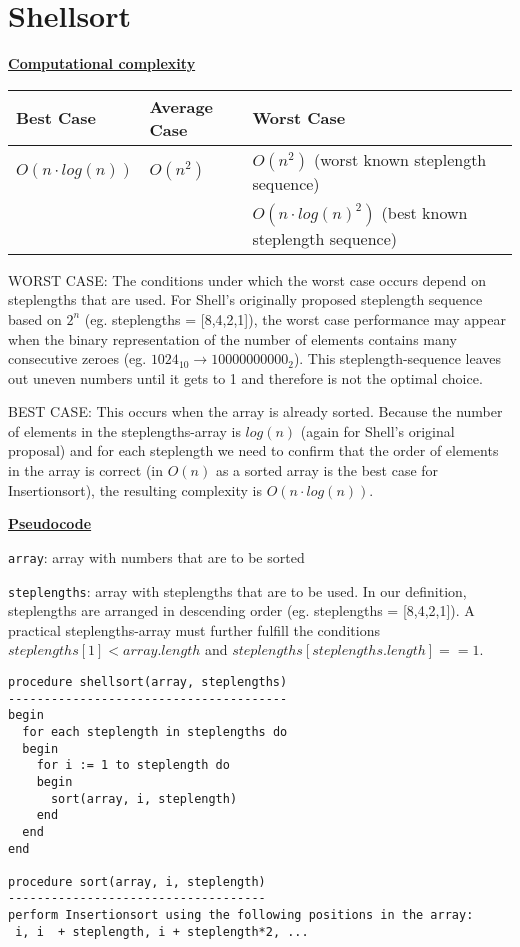 \documentclass[a4paper]{report}
\begin{document}
\chapter*{Shellsort}

\underline{\bf{Computational complexity}}

\begin{tabular}{|l|l| l |}
\hline
Best Case    & Average Case  &  Worst Case\\ \hline
$O(n\cdot log(n))$ & $O(n^2)$  &  $O(n^2)$ (worst known steplength sequence) \\
& & $O(n\cdot log(n)^2)$ (best known steplength sequence) \\ \hline
\end{tabular}

WORST CASE: The conditions under which the worst case occurs depend on steplengths that are used. For Shell's originally proposed steplength sequence based on $2^n$ (eg. steplengths = [8,4,2,1]), the worst case performance may appear when the binary representation of the number of elements contains many consecutive zeroes (eg. $1024_{10} \rightarrow 10000000000_2$). This steplength-sequence leaves out uneven numbers until it gets to 1 and therefore is not the optimal choice.

BEST CASE: This occurs when the array is already sorted. Because the number of elements in the steplengths-array is $log(n)$ (again for Shell's original proposal) and for each steplength we need to confirm that the order of elements in the array is correct (in $O(n)$ as a sorted array is the best case for Insertionsort), the resulting complexity is $O(n \cdot log(n))$.


\underline{\bf{Pseudocode}}

\texttt{array}: array with numbers that are to be sorted

\texttt{steplengths}: array with steplengths that are to be used. In our definition, steplengths are arranged in descending order (eg. steplengths = [8,4,2,1]). A practical steplengths-array must further fulfill the conditions $steplengths[1] < array.length$ and $steplengths[steplengths.length] == 1$.


\begin{lstlisting}
procedure shellsort(array, steplengths)
---------------------------------------
begin
  for each steplength in steplengths do
  begin
    for i := 1 to steplength do
    begin
  	  sort(array, i, steplength)   
    end
  end
end

procedure sort(array, i, steplength)
------------------------------------
perform Insertionsort using the following positions in the array:
 i, i  + steplength, i + steplength*2, ...

\end{lstlisting}
\end{document}
